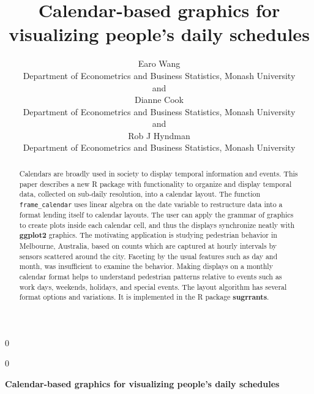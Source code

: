 \documentclass[12pt]{article}
\newcommand{\blind}{0}
\begin{document}
\def\spacingset#1{\renewcommand{\baselinestretch}%
{#1}\small\normalsize} \spacingset{1}



\blind
{
  \title{\bf Calendar-based graphics for visualizing people's daily schedules}

  \author{
        Earo Wang \\
    Department of Econometrics and Business Statistics, Monash University\\
     and \\     Dianne Cook \\
    Department of Econometrics and Business Statistics, Monash University\\
     and \\     Rob J Hyndman \\
    Department of Econometrics and Business Statistics, Monash University\\
      }
  \maketitle
} \fi

\blind
{
  \bigskip
  \bigskip
  \bigskip
  \begin{center}
    {\LARGE\bf Calendar-based graphics for visualizing people's daily schedules}
  \end{center}
  \medskip
} \fi

\bigskip
\begin{abstract}
Calendars are broadly used in society to display temporal information and events. This paper describes a new R package with functionality to organize and display temporal data, collected on sub-daily resolution, into a calendar layout. The function \texttt{frame\_calendar} uses linear algebra on the date variable to restructure data into a format lending itself to calendar layouts. The user can apply the grammar of graphics to create plots inside each calendar cell, and thus the displays synchronize neatly with \textbf{ggplot2} graphics. The motivating application is studying pedestrian behavior in Melbourne, Australia, based on counts which are captured at hourly intervals by sensors scattered around the city. Faceting by the usual features such as day and month, was insufficient to examine the behavior. Making displays on a monthly calendar format helps to understand pedestrian patterns relative to events such as work days, weekends, holidays, and special events. The layout algorithm has several format options and variations. It is implemented in the R package \textbf{sugrrants}.
\end{abstract}
\end{document}
